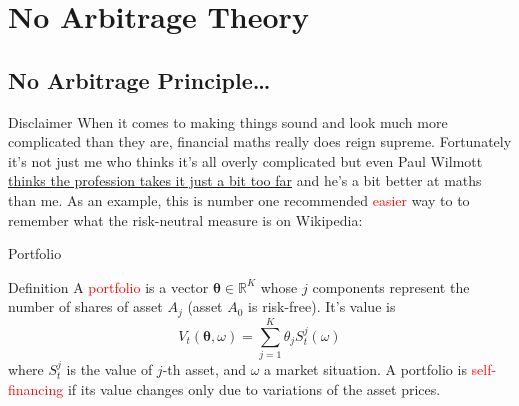 \documentclass{beamer}
\begin{document}
\section{No Arbitrage Theory}
\subsection{No Arbitrage Principle\ldots}

\begin{frame}{Disclaimer}
When it comes to making things sound and look much more complicated than they are, financial maths really does reign supreme. Fortunately it’s not just me who thinks it’s all overly complicated but even Paul Wilmott \href{https://wilmott.com/science-in-finance-viii-the-maths-sweet-spot/}{thinks the profession takes it just a bit too far} and he’s a bit better at maths than me.\vspace{0.5cm}
\pause
As an example, this is number one recommended \textcolor{red}{easier} way to to remember what the risk-neutral measure is on Wikipedia:

\end{frame}

\begin{frame}{Portfolio}
	\begin{block}{Definition}
		A \textcolor{red}{portfolio} is a vector $\mathbf{\theta}\in \mathbb{R}^K$ whose $j$ components represent the number of shares of asset $A_j$ (asset $A_0$ is risk-free). It's value is
		\begin{equation}
			V_t(\mathbf{\theta}, \omega)=\sum_{j=1}^K\theta_jS^j_t(\omega)
		\end{equation} 
		where $S_t^j$ is the value of $j$-th asset, and $\omega$ a market situation. A portfolio is \textcolor{red}{self-financing} if its value changes only due to variations of the asset prices.
	\end{block}
\end{frame}
\end{document}
